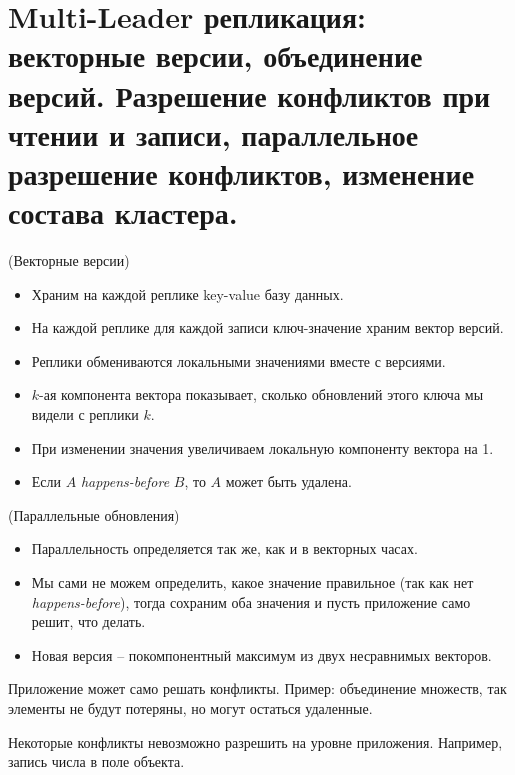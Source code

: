 \section{Multi-Leader репликация: векторные версии, объединение версий. Разрешение конфликтов при чтении и записи, параллельное разрешение конфликтов, изменение состава кластера.}

\begin{algorithm}(Векторные версии)
    \begin{itemize}
        \item Храним на каждой реплике key-value базу данных.
        \item На каждой реплике для каждой записи ключ-значение храним вектор версий.
        \item Реплики обмениваются локальными значениями вместе с версиями.
        \item $k$-ая компонента вектора показывает, сколько обновлений этого ключа мы видели с реплики $k$.
        \item При изменении значения увеличиваем локальную компоненту вектора на 1.
        \item Если $A$ \textit{happens-before} $B$, то $A$ может быть удалена.
    \end{itemize}
\end{algorithm}

\begin{algorithm}(Параллельные обновления)
    \begin{itemize}
        \item Параллельность определяется так же, как и в векторных часах.
        \item Мы сами не можем определить, какое значение правильное (так как нет \textit{happens-before}), тогда сохраним оба значения и пусть приложение само решит, что делать.
        \item Новая версия -- покомпонентный максимум из двух несравнимых векторов.
    \end{itemize}
\end{algorithm}

\begin{remark}
    Приложение может само решать конфликты. Пример: объединение множеств, так элементы не будут потеряны, но могут остаться удаленные.
\end{remark}

\begin{remark}
    Некоторые конфликты невозможно разрешить на уровне приложения. Например, запись числа в поле объекта.
\end{remark}

